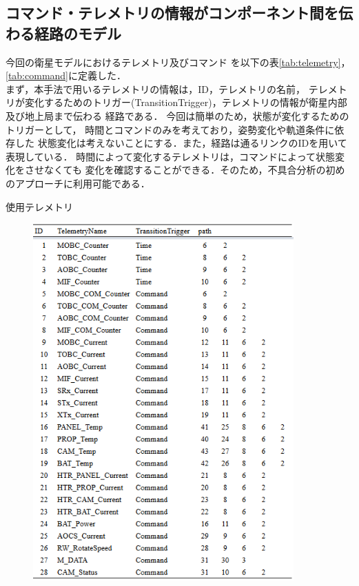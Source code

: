 \documentclass[11pt]{jsreport}
\begin{document}
\subsection{コマンド・テレメトリの情報がコンポーネント間を伝わる経路のモデル}
今回の衛星モデルにおけるテレメトリ及びコマンド
を以下の表\ref{tab:telemetry}，\ref{tab:command}に定義した．\\
まず，本手法で用いるテレメトリの情報は，ID，テレメトリの名前，
テレメトリが変化するためのトリガー(TransitionTrigger)，テレメトリの情報が衛星内部及び地上局まで伝わる
経路である．%
今回は簡単のため，状態が変化するためのトリガーとして，
時間とコマンドのみを考えており，姿勢変化や軌道条件に依存した
状態変化は考えないことにする．また，経路は通るリンクのIDを用いて
表現している．
時間によって変化するテレメトリは，コマンドによって状態変化をさせなくても
変化を確認することができる．そのため，不具合分析の初めのアプローチに利用可能である．

\newpage
\begin{table}[H]
   \centering
   \caption{使用テレメトリ}
   \label{tab:telemetry}
\end{table}
\vspace{-2zh}
\begin{figure}[H]
   \centering
      \includegraphics[width=10.0cm]{figure/TEL.png}
\end{figure}
\end{document}
